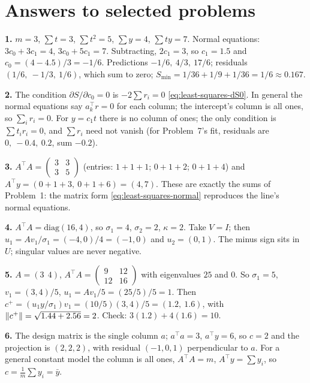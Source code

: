 \section{Answers to selected problems}\label{sec:least-squares-answers}

\textbf{1.} $m=3$, $\sum t = 3$, $\sum t^2 = 5$, $\sum y = 4$, $\sum ty = 7$. Normal equations: $3c_0+3c_1 = 4$, $3c_0+5c_1 = 7$. Subtracting, $2c_1 = 3$, so $c_1 = 1.5$ and $c_0 = (4-4.5)/3 = -1/6$. Predictions $-1/6,\ 4/3,\ 17/6$; residuals $(1/6,\ -1/3,\ 1/6)$, which sum to zero; $S_{\min} = 1/36+1/9+1/36 = 1/6\approx0.167$.

\textbf{2.} The condition $\partial S/\partial c_0 = 0$ is $-2\sum r_i = 0$ \cref{eq:least-squares-dS0}. In general the normal equations say $a_k^\top r = 0$ for each column; the intercept's column is all ones, so $\sum_i r_i = 0$. For $y = c_1 t$ there is no column of ones; the only condition is $\sum t_ir_i = 0$, and $\sum r_i$ need not vanish (for Problem~7's fit, residuals are $0,\ -0.4,\ 0.2$, sum $-0.2$).

\textbf{3.} $A^\top A = \begin{pmatrix}3&3\\3&5\end{pmatrix}$ (entries: $1+1+1$; $0+1+2$; $0+1+4$) and $A^\top y = (0+1+3,\ 0+1+6) = (4,7)$. These are exactly the sums of Problem~1: the matrix form \cref{eq:least-squares-normal} reproduces the line's normal equations.

\textbf{4.} $A^\top A = \mathrm{diag}(16,4)$, so $\sigma_1 = 4$, $\sigma_2 = 2$, $\kappa = 2$. Take $V = I$; then $u_1 = Av_1/\sigma_1 = (-4,0)/4 = (-1,0)$ and $u_2 = (0,1)$. The minus sign sits in $U$; singular values are never negative.

\textbf{5.} $A = (3\ \ 4)$, $A^\top A = \begin{pmatrix}9&12\\12&16\end{pmatrix}$ with eigenvalues $25$ and $0$. So $\sigma_1 = 5$, $v_1 = (3,4)/5$, $u_1 = Av_1/5 = (25/5)/5 = 1$. Then $c^+ = (u_1y/\sigma_1)v_1 = (10/5)(3,4)/5 = (1.2,\ 1.6)$, with $\left\lVert c^+\right\rVert = \sqrt{1.44+2.56} = 2$. Check: $3(1.2)+4(1.6) = 10$.

\textbf{6.} The design matrix is the single column $a$; $a^\top a = 3$, $a^\top y = 6$, so $c = 2$ and the projection is $(2,2,2)$, with residual $(-1,0,1)$ perpendicular to $a$. For a general constant model the column is all ones, $A^\top A = m$, $A^\top y = \sum y_i$, so $c = \frac1m\sum y_i = \bar y$.

